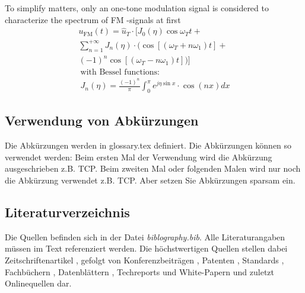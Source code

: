\documentclass[conference]{IEEEtran}
\begin{document}
To simplify matters, only an one-tone modulation signal is considered to characterize the spectrum of \gls{FM} -signals at first
\begin{multline}
u_{\textrm{FM}}(t)=\hat u_T \cdot [J_0(\eta)\cos\omega_Tt +
\\ \sum_{n=1}^{+\infty} J_n(\eta) \cdot (\cos[(\omega_T+n\omega_1)t]+
\\(-1)^n \cos[(\omega_T-n\omega_1)t])] 
\\ \ \mbox{with Bessel functions:} 
\\ \ J_n(\eta)= \frac{(-1)^n}{\pi} \int_0^{\pi} e^{j\eta\sin x} \cdot \cos(nx) dx 
\end{multline}

\subsection{Verwendung von Abkürzungen}
Die Abkürzungen werden in glossary.tex definiert. Die Abkürzungen können so verwendet werden:
Beim ersten Mal der Verwendung wird die Abkürzung ausgeschrieben z.B. \gls{TCP}. Beim zweiten Mal oder folgenden Malen wird nur noch die Abkürzung verwendet z.B. \gls{TCP}.
Aber setzen Sie Abkürzungen sparsam ein.

\subsection{Literaturverzeichnis}
Die Quellen befinden sich in der Datei \textit{biblography.bib}. 
Alle Literaturangaben müssen im Text referenziert werden. Die höchstwertigen Quellen stellen dabei Zeitschriftenartikel \cite{Laprie2004}, gefolgt von Konferenzbeiträgen \cite{Agrou2011}, Patenten \cite{Grisenthwaite2012}, Standards \cite{ARINC2005}, Fachbüchern \cite{Kopetz2011},  Datenblättern \cite{Freescale2015}, Techreports und White-Papern \cite{Aswadhati2011} und zuletzt Onlinequellen \cite{Xil2010} dar.



\end{document}
